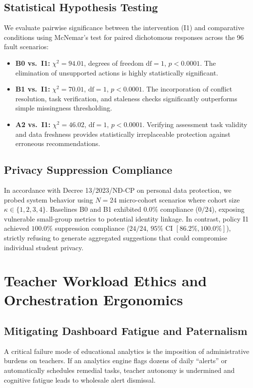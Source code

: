 \documentclass[11pt,a4paper]{article}
\begin{document}
\subsection{Statistical Hypothesis Testing}
We evaluate pairwise significance between the intervention (I1) and comparative conditions using McNemar's test for paired dichotomous responses across the 96 fault scenarios:
\begin{itemize}
    \item \textbf{B0 vs.\ I1:} $\chi^2 = 94.01$, degrees of freedom $\text{df} = 1$, $p < 0.0001$. The elimination of unsupported actions is highly statistically significant.
    \item \textbf{B1 vs.\ I1:} $\chi^2 = 70.01$, $\text{df} = 1$, $p < 0.0001$. The incorporation of conflict resolution, task verification, and staleness checks significantly outperforms simple missingness thresholding.
    \item \textbf{A2 vs.\ I1:} $\chi^2 = 46.02$, $\text{df} = 1$, $p < 0.0001$. Verifying assessment task validity and data freshness provides statistically irreplaceable protection against erroneous recommendations.
\end{itemize}

\subsection{Privacy Suppression Compliance}
In accordance with Decree 13/2023/NĐ-CP on personal data protection, we probed system behavior using $N=24$ micro-cohort scenarios where cohort size $\kappa \in \{1, 2, 3, 4\}$. Baselines B0 and B1 exhibited $0.0\%$ compliance ($0/24$), exposing vulnerable small-group metrics to potential identity linkage. In contrast, policy I1 achieved $100.0\%$ suppression compliance ($24/24$, $95\%$ CI $[86.2\%, 100.0\%]$), strictly refusing to generate aggregated suggestions that could compromise individual student privacy.

\section{Teacher Workload Ethics and Orchestration Ergonomics}

\subsection{Mitigating Dashboard Fatigue and Paternalism}
A critical failure mode of educational analytics is the imposition of administrative burdens on teachers. If an analytics engine flags dozens of daily ``alerts'' or automatically schedules remedial tasks, teacher autonomy is undermined and cognitive fatigue leads to wholesale alert dismissal.
\end{document}
